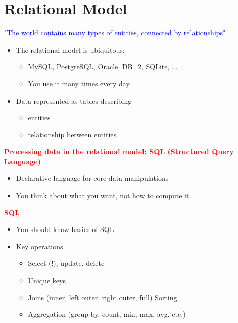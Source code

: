 \documentclass[11pt]{article}
\begin{document}
\section*{Relational Model}

\textcolor{blue}{"The world contains many types of entities, connected by relationships"}

\begin{itemize}
	\item The relational model is ubiquitous: 
	\begin{itemize}
		\item MySQL, PostgreSQL, Oracle, DB_2, SQLite, ...
		\item You use it many times every day
	\end{itemize}
	
	\item Data represented as tables describing
	\begin{itemize}
		\item entities
		\item relationship between entities
        \end{itemize}
\end{itemize}

\vspace{1cm}
\textbf{\textcolor{red}{Processing data in the relational model: SQL (Structured Query Language)}}

\begin{itemize}
	\item Declarative language for core data manipulations
	\item You think about what you want, not how to compute it
\end{itemize}

\vspace{0.5cm}
\textbf{\textcolor{red}{SQL}}

\begin{itemize}
	\item You should know basics of SQL
	\item Key operations
	\begin{itemize}
		\item Select (!), update, delete
		\item Unique keys
		\item Joins (inner, left outer, right outer, full)
		\items Sorting
		\item Aggregation (group by, count, min, max, avg, etc.)
	\end{itemize}
\end{itemize}
\end{document}
